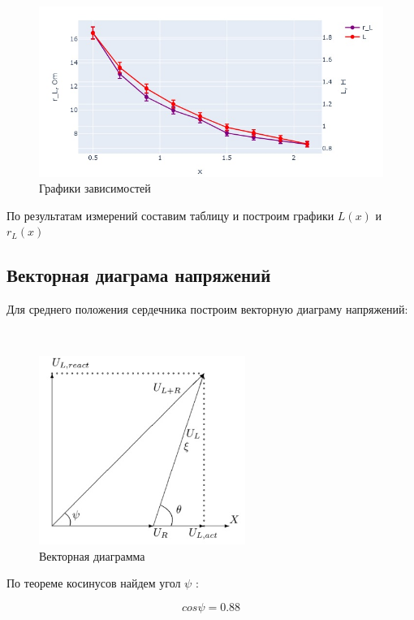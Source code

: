 \begin{figure}[h!]
	\includegraphics[width = 1.2\textwidth]{pics/graph322 (1).jpg}
	\caption{Графики зависимостей}
	\label{Pic1}
\end{figure}


По результатам измерений составим таблицу и построим графики $ L(x) $ и $ r_{L}(x) $
\subsection{Векторная диаграма напряжений}

Для среднего положения сердечника построим векторную диаграму напряжений:

\begin{center}

\end{center}\

\begin{figure}[h]
	\includegraphics[width = 0.6\textwidth]{pics/vect_diag.jpg}
	\caption{Векторная диаграмма}
	\label{Pic1}
\end{figure}


По теореме косинусов найдем угол $ {\psi} $ :


$$cos\psi = 0.88$$


